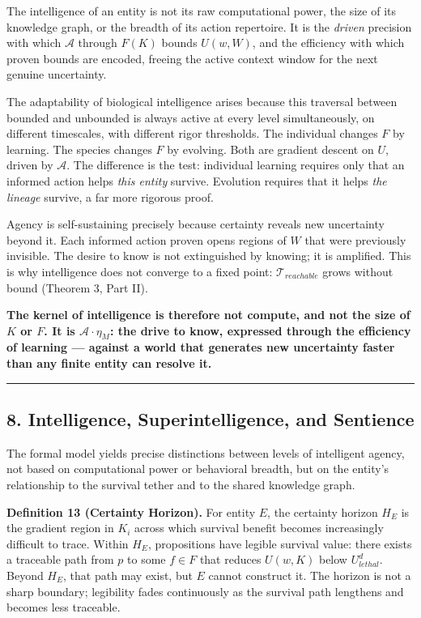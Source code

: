 \documentclass[
]{article}
\begin{document}
The intelligence of an entity is not its raw computational power, the
size of its knowledge graph, or the breadth of its action repertoire. It
is the \emph{driven} precision with which \(\mathcal{A}\) through
\(F(K)\) bounds \(U(w, W)\), and the efficiency with which proven bounds
are encoded, freeing the active context window for the next genuine
uncertainty.

The adaptability of biological intelligence arises because this
traversal between bounded and unbounded is always active at every level
simultaneously, on different timescales, with different rigor
thresholds. The individual changes \(F\) by learning. The species
changes \(F\) by evolving. Both are gradient descent on \(U\), driven by
\(\mathcal{A}\). The difference is the test: individual learning
requires only that an informed action helps \emph{this entity} survive.
Evolution requires that it helps \emph{the lineage} survive, a far more
rigorous proof.

Agency is self-sustaining precisely because certainty reveals new
uncertainty beyond it. Each informed action proven opens regions of
\(W\) that were previously invisible. The desire to know is not
extinguished by knowing; it is amplified. This is why intelligence does
not converge to a fixed point: \(\mathcal{T}_{reachable}\) grows without
bound (Theorem 3, Part II).

\textbf{The kernel of intelligence is therefore not compute, and not the
size of \(K\) or \(F\). It is \(\mathcal{A} \cdot \eta_M\): the drive to
know, expressed through the efficiency of learning --- against a world
that generates new uncertainty faster than any finite entity can resolve
it.}

\begin{center}\rule{0.5\linewidth}{0.5pt}\end{center}

\subsection{8. Intelligence, Superintelligence, and
Sentience}\label{intelligence-superintelligence-and-sentience}

The formal model yields precise distinctions between levels of
intelligent agency, not based on computational power or behavioral
breadth, but on the entity's relationship to the survival tether and to
the shared knowledge graph.

\textbf{Definition 13 (Certainty Horizon).} For entity \(E\), the
certainty horizon \(H_E\) is the gradient region in \(K_i\) across which
survival benefit becomes increasingly difficult to trace. Within
\(H_E\), propositions have legible survival value: there exists a
traceable path from \(p\) to some \(f \in F\) that reduces \(U(w, K)\)
below \(U_{lethal}^d\). Beyond \(H_E\), that path may exist, but \(E\)
cannot construct it. The horizon is not a sharp boundary; legibility
fades continuously as the survival path lengthens and becomes less
traceable.
\end{document}
